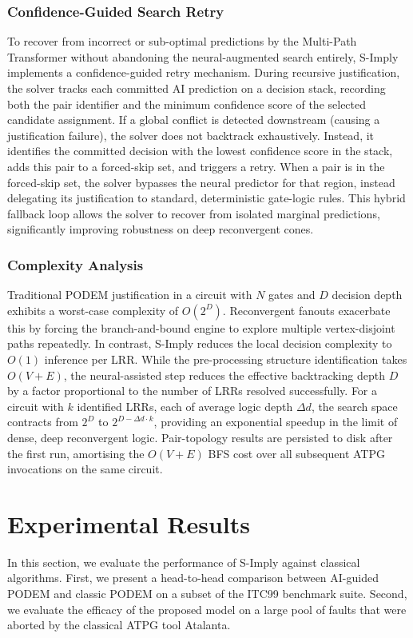 \documentclass[conference]{IEEEtran}
\begin{document}
\subsubsection{Confidence-Guided Search Retry}
To recover from incorrect or sub-optimal predictions by the Multi-Path Transformer without abandoning the neural-augmented search entirely, S-Imply implements a confidence-guided retry mechanism. During recursive justification, the solver tracks each committed AI prediction on a decision stack, recording both the pair identifier and the minimum confidence score of the selected candidate assignment. If a global conflict is detected downstream (causing a justification failure), the solver does not backtrack exhaustively. Instead, it identifies the committed decision with the lowest confidence score in the stack, adds this pair to a forced-skip set, and triggers a retry. When a pair is in the forced-skip set, the solver bypasses the neural predictor for that region, instead delegating its justification to standard, deterministic gate-logic rules. This hybrid fallback loop allows the solver to recover from isolated marginal predictions, significantly improving robustness on deep reconvergent cones.

\subsubsection{Complexity Analysis}
Traditional PODEM justification in a circuit with $N$ gates and $D$ decision depth exhibits a worst-case complexity of $O(2^D)$. Reconvergent fanouts exacerbate this by forcing the branch-and-bound engine to explore multiple vertex-disjoint paths repeatedly. In contrast, S-Imply reduces the local decision complexity to $O(1)$ inference per LRR.
While the pre-processing structure identification takes $O(V+E)$, the neural-assisted step reduces the effective backtracking depth $D$ by a factor proportional to the number of LRRs resolved successfully. For a circuit with $k$ identified LRRs, each of average logic depth $\Delta d$, the search space contracts from $2^D$ to $2^{D - \Delta d \cdot k}$, providing an exponential speedup in the limit of dense, deep reconvergent logic. Pair-topology results are persisted to disk after the first run, amortising the $O(V+E)$ BFS cost over all subsequent ATPG invocations on the same circuit.

\section{Experimental Results}
In this section, we evaluate the performance of S-Imply against classical algorithms. First, we present a head-to-head comparison between AI-guided PODEM and classic PODEM on a subset of the ITC99 benchmark suite. Second, we evaluate the efficacy of the proposed model on a large pool of faults that were aborted by the classical ATPG tool Atalanta.
\end{document}
